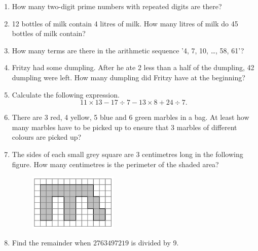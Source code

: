 \documentclass[11pt]{scrartcl}
\begin{document}
\begin{enumerate}
    \item How many two-digit prime numbers with repeated digits are there?

    \item \vspace{10cm} 12 bottles of milk contain 4 litres of milk. How many litres of milk do 45 bottles of milk contain?

    \newpage

    \item \vspace{10cm} How many terms are there in the arithmetic sequence '4, 7, 10, \ldots, 58, 61'?

    \item \vspace{10cm} Fritzy had some dumpling. After he ate 2 less than a half of the dumpling, 42 dumpling were left. How many dumpling did Fritzy have at the beginning?

    \newpage

    \item \vspace{10cm} Calculate the following expression.
    $$11 \times 13 - 17 \div 7 - 13 \times 8 +24 \div 7.$$

    \item \vspace{10cm} There are 3 red, 4 yellow, 5 blue and 6 green marbles in a bag. At least how many marbles have to be picked up to ensure that 3 marbles of different colours are picked up?

    \newpage

    \item \vspace{10cm} The sides of each small grey square are 3 centimetres long in the following figure. How many centimetres is the perimeter of the shaded area?
    \begin{figure}[h]
        \centering
        \includegraphics[width=0.4\textwidth]{StarGen/AIMO Trial G3-4 2024/perimeter-weird.png}
    \end{figure}

    \item \vspace{10cm} Find the remainder when $2763497219$ is divided by 9.

    \newpage
\end{enumerate}
\vspace{10cm}
\end{document}
